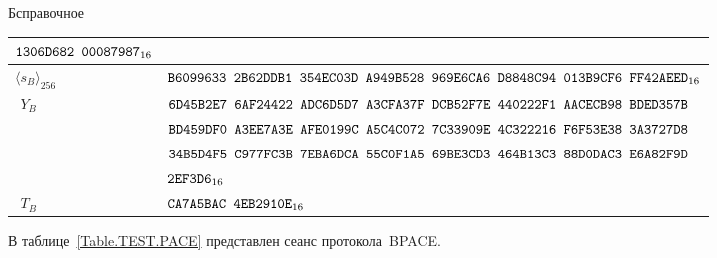 \begin{appendix}{Б}{справочное}
\begin{table}[H]
{\begin{tabular}{|l|l|}
$\texttt{1306D682~00087987}_{16}$\\
%
\hline
\hline
%
$\langle s_B\rangle_{256}$ & 
$\texttt{B6099633~2B62DDB1~354EC03D~A949B528~969E6CA6~D8848C94~013B9CF6~FF42AEED}_{16}$\\
%
\hline
$\phantom{\langle}Y_B$ & 
$\texttt{6D45B2E7~6AF24422~ADC6D5D7~A3CFA37F~DCB52F7E~440222F1~AACECB98~BDED357B}$\\
&
$\texttt{BD459DF0~A3EE7A3E~AFE0199C~A5C4C072~7C33909E~4C322216~F6F53E38~3A3727D8}$\\
&
$\texttt{34B5D4F5~C977FC3B~7EBA6DCA~55C0F1A5~69BE3CD3~464B13C3~88D0DAC3~E6A82F9D}$\\
&
$\texttt{2EF3D6}_{16}$\\
%
\hline
$\phantom{\langle}T_B$ & 
$\texttt{CA7A5BAC~4EB2910E}_{16}$\\
\hline
\end{tabular}
}
\end{table}

\clearpage
{}\label{TEST.PACE}

В таблице~\ref{Table.TEST.PACE} представлен сеанс протокола~BPACE.


\end{appendix}
